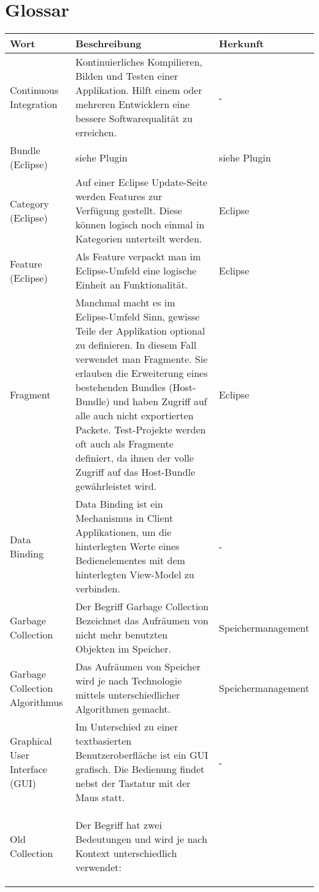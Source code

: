 \chapter*{Glossar}\label{glossar}
  \begin{longtable}{|p{4.5cm}|p{6cm}|p{4.1cm}|}
\hline
  \textbf{Wort} & \textbf{Beschreibung} & \textbf{Herkunft}\\\hline
  Continuous Integration  & Kontinuierliches Kompilieren, Bilden und Testen einer Applikation. Hilft einem oder mehreren Entwicklern eine bessere Softwarequalität zu erreichen.&-\\\hline
  Bundle (Eclipse) & siehe Plugin & siehe Plugin\\\hline
  Category (Eclipse) & Auf einer Eclipse Update-Seite werden Features zur Verfügung gestellt. Diese können logisch noch einmal in Kategorien unterteilt werden. & Eclipse\\\hline
  Feature (Eclipse) & Als Feature verpackt man im Eclipse-Umfeld eine logische Einheit an Funktionalität. & Eclipse\\\hline
  Fragment & Manchmal macht es im Eclipse-Umfeld Sinn, gewisse Teile der Applikation optional zu definieren. In diesem Fall verwendet man Fragmente. Sie erlauben die Erweiterung eines bestehenden Bundles (Host-Bundle) und haben Zugriff auf alle auch nicht exportierten Packete. Test-Projekte werden oft auch als Fragmente definiert, da ihnen der volle Zugriff auf das Host-Bundle gewährleistet wird. & Eclipse\\\hline
  Data Binding & Data Binding ist ein Mechanismus in Client Applikationen, um die hinterlegten Werte eines Bedienelementes mit dem hinterlegten View-Model zu verbinden.  & - \\\hline
  Garbage Collection & Der Begriff Garbage Collection Bezeichnet das Aufräumen von nicht mehr benutzten Objekten im Speicher.& Speichermanagement \\\hline
  Garbage Collection Algorithmus & Das Aufräumen von Speicher wird je nach Technologie mittels unterschiedlicher Algorithmen gemacht.  & Speichermanagement \\\hline
 Graphical User Interface (GUI)& Im Unterschied zu einer textbasierten Benutzeroberfläche ist ein GUI grafisch. Die Bedienung findet nebst der Tastatur mit der Maus statt. & -\\\hline
  Old Collection & Der Begriff hat zwei Bedeutungen und wird je nach Kontext unterschiedlich verwendet:
	\begin{itemize}

\end{itemize}
\end{longtable}
